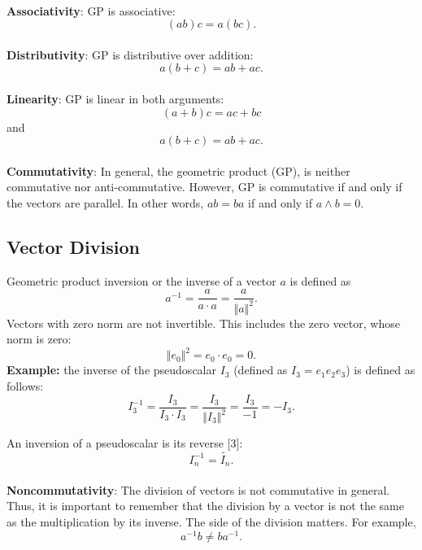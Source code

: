 \documentclass{article}
\begin{document}
\paragraph{}\textbf{Associativity}: GP is associative: $$(ab)c = a(bc).$$

\paragraph{}\textbf{Distributivity}: GP is distributive over addition: $$a(b+c) = ab + ac.$$

\paragraph{}\textbf{Linearity}: GP is linear in both arguments: 
$$(a+b)c = ac + bc$$ and $$a(b+c) = ab + ac.$$

\paragraph{}\textbf{Commutativity}: In general, the geometric product (GP), is neither commutative nor anti-commutative.
However, GP is commutative if and only if the vectors are parallel. 
In other words, $ab = ba$ if and only if $a \wedge b = 0$.

\subsection{\textbf{Vector Division}}

Geometric product inversion or the inverse of a vector $a$ is defined as $$a^{-1} = \frac{a}{a \cdot a} = \frac {a}{\Vert{a}\Vert^2}.$$
Vectors with zero norm are not invertible. This includes the zero vector, whose norm is zero:
$$\Vert{e_0}\Vert^2 = e_0 \cdot e_0 = 0.$$
\textbf{Example:} the inverse of the pseudoscalar $I_3$ (defined as $I_3 = e_1 e_2 e_3$) is defined as follows:
$$I_3^{-1} = \frac{I_3}{I_3 \cdot I_3} = \frac {I_3}{\Vert{I_3}\Vert^2} = \frac {I_3}{-1} = -I_3.$$

An inversion of a pseudoscalar is its reverse [3]: $$I_n^{-1} = \tilde{I_n}.$$

\paragraph{}\textbf{Noncommutativity}: The division of vectors is not commutative in general. Thus, it is important to
remember that the division by a vector is not the same as the multiplication by its inverse. The side of the division
matters. For example, $$a^{-1}b \neq ba^{-1}.$$
\end{document}
